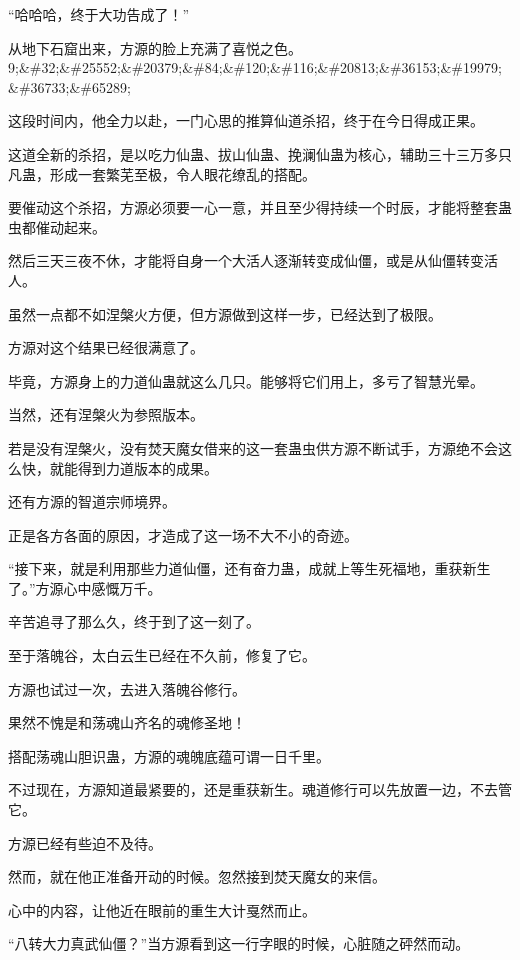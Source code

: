 
\begin{this_body}

“哈哈哈，终于大功告成了！”

从地下石窟出来，方源的脸上充满了喜悦之色。9;\&\#32;\&\#25552;\&\#20379;\&\#84;\&\#120;\&\#116;\&\#20813;\&\#36153;\&\#19979;\&\#36733;\&\#65289;

这段时间内，他全力以赴，一门心思的推算仙道杀招，终于在今日得成正果。

这道全新的杀招，是以吃力仙蛊、拔山仙蛊、挽澜仙蛊为核心，辅助三十三万多只凡蛊，形成一套繁芜至极，令人眼花缭乱的搭配。

要催动这个杀招，方源必须要一心一意，并且至少得持续一个时辰，才能将整套蛊虫都催动起来。

然后三天三夜不休，才能将自身一个大活人逐渐转变成仙僵，或是从仙僵转变活人。

虽然一点都不如涅槃火方便，但方源做到这样一步，已经达到了极限。

方源对这个结果已经很满意了。

毕竟，方源身上的力道仙蛊就这么几只。能够将它们用上，多亏了智慧光晕。

当然，还有涅槃火为参照版本。

若是没有涅槃火，没有焚天魔女借来的这一套蛊虫供方源不断试手，方源绝不会这么快，就能得到力道版本的成果。

还有方源的智道宗师境界。

正是各方各面的原因，才造成了这一场不大不小的奇迹。

“接下来，就是利用那些力道仙僵，还有奋力蛊，成就上等生死福地，重获新生了。”方源心中感慨万千。

辛苦追寻了那么久，终于到了这一刻了。

至于落魄谷，太白云生已经在不久前，修复了它。

方源也试过一次，去进入落魄谷修行。

果然不愧是和荡魂山齐名的魂修圣地！

搭配荡魂山胆识蛊，方源的魂魄底蕴可谓一日千里。

不过现在，方源知道最紧要的，还是重获新生。魂道修行可以先放置一边，不去管它。

方源已经有些迫不及待。

然而，就在他正准备开动的时候。忽然接到焚天魔女的来信。

心中的内容，让他近在眼前的重生大计戛然而止。

“八转大力真武仙僵？”当方源看到这一行字眼的时候，心脏随之砰然而动。


\end{this_body}
